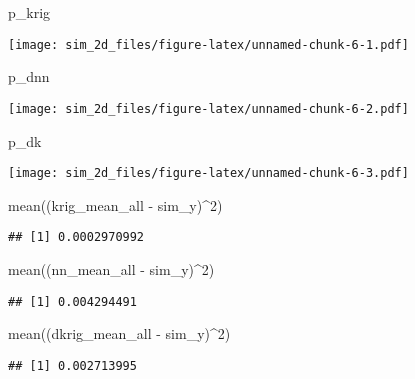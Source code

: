 \documentclass[
]{article}
\newenvironment{Shaded}{\begin{snugshade}}{\end{snugshade}}
\newcommand{\DecValTok}[1]{\textcolor[rgb]{0.00,0.00,0.81}{#1}}
\newcommand{\FunctionTok}[1]{\textcolor[rgb]{0.00,0.00,0.00}{#1}}
\newcommand{\NormalTok}[1]{#1}
\newcommand{\SpecialCharTok}[1]{\textcolor[rgb]{0.00,0.00,0.00}{#1}}
\begin{document}
\begin{Shaded}
\begin{Highlighting}[]
\NormalTok{p\_krig}
\end{Highlighting}
\end{Shaded}

\texttt{[image: sim\_2d\_files/figure-latex/unnamed-chunk-6-1.pdf]}

\begin{Shaded}
\begin{Highlighting}[]
\NormalTok{p\_dnn}
\end{Highlighting}
\end{Shaded}

\texttt{[image: sim\_2d\_files/figure-latex/unnamed-chunk-6-2.pdf]}

\begin{Shaded}
\begin{Highlighting}[]
\NormalTok{p\_dk}
\end{Highlighting}
\end{Shaded}

\texttt{[image: sim\_2d\_files/figure-latex/unnamed-chunk-6-3.pdf]}

\begin{Shaded}
\begin{Highlighting}[]
\FunctionTok{mean}\NormalTok{((krig\_mean\_all }\SpecialCharTok{{-}}\NormalTok{ sim\_y)}\SpecialCharTok{\^{}}\DecValTok{2}\NormalTok{)}
\end{Highlighting}
\end{Shaded}

\begin{verbatim}
## [1] 0.0002970992
\end{verbatim}

\begin{Shaded}
\begin{Highlighting}[]
\FunctionTok{mean}\NormalTok{((nn\_mean\_all }\SpecialCharTok{{-}}\NormalTok{ sim\_y)}\SpecialCharTok{\^{}}\DecValTok{2}\NormalTok{)}
\end{Highlighting}
\end{Shaded}

\begin{verbatim}
## [1] 0.004294491
\end{verbatim}

\begin{Shaded}
\begin{Highlighting}[]
\FunctionTok{mean}\NormalTok{((dkrig\_mean\_all }\SpecialCharTok{{-}}\NormalTok{ sim\_y)}\SpecialCharTok{\^{}}\DecValTok{2}\NormalTok{)}
\end{Highlighting}
\end{Shaded}

\begin{verbatim}
## [1] 0.002713995
\end{verbatim}
\end{document}
